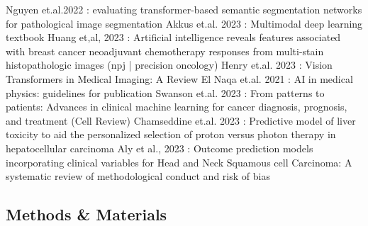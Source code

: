 \documentclass{article}%
\begin{document}
\newline%
\newline%
%
Nguyen et.al.2022 : evaluating transformer{-}based semantic segmentation networks for pathological image segmentation%
\newline%
\newline%
%
Akkus et.al. 2023 : Multimodal deep learning textbook%
\newline%
\newline%
%
Huang et,al, 2023 : Artificial intelligence reveals features associated with breast cancer neoadjuvant chemotherapy responses from multi{-}stain histopathologic images (npj | precision oncology)%
\newline%
\newline%
%
Henry et.al. 2023 : Vision Transformers in Medical Imaging: A Review%
\newline%
\newline%
%
El Naqa et.al. 2021 : AI in medical physics: guidelines for publication%
\newline%
\newline%
%
Swanson et.al. 2023 : From patterns to patients: Advances in clinical machine learning for cancer diagnosis, prognosis, and treatment (Cell Review)%
\newline%
\newline%
%
Chamseddine et.al. 2023 : Predictive model of liver toxicity to aid the personalized selection of proton versus photon therapy in hepatocellular carcinoma%
\newline%
\newline%
%
Aly et al., 2023 : Outcome prediction models incorporating clinical variables for Head and Neck Squamous cell Carcinoma: A systematic review of methodological conduct and risk of bias%
\newline%
\newline%
%
%
\newline%
\newline%
%
\subsection{Methods \& Materials}%
\label{subsec:MethodsMaterials}%
\end{document}
